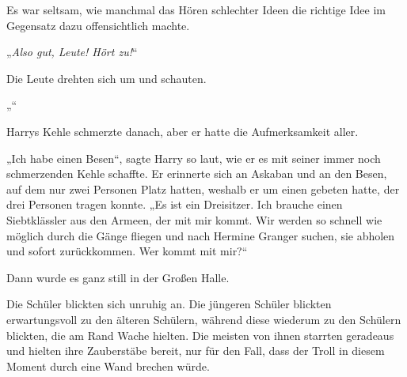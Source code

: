 Es war seltsam, wie manchmal das Hören schlechter Ideen die richtige Idee im Gegensatz dazu offensichtlich machte.

„\emph{Also gut, Leute! Hört zu!}“

Die Leute drehten sich um und schauten.

„“

Harrys Kehle schmerzte danach, aber er hatte die Aufmerksamkeit aller.

„Ich habe einen Besen“, sagte Harry so laut, wie er es mit seiner immer noch schmerzenden Kehle schaffte. Er erinnerte sich an Askaban und an den Besen, auf dem nur zwei Personen Platz hatten, weshalb er um einen gebeten hatte, der drei Personen tragen konnte.
„Es ist ein Dreisitzer. Ich brauche einen Siebtklässler aus den Armeen, der mit mir kommt. Wir werden so schnell wie möglich durch die Gänge fliegen und nach Hermine Granger suchen, sie abholen und sofort zurückkommen. Wer kommt mit mir?“

Dann wurde es ganz still in der Großen Halle.

\later

Die Schüler blickten sich unruhig an. Die jüngeren Schüler blickten erwartungsvoll zu den älteren Schülern, während diese wiederum zu den Schülern blickten, die am Rand Wache hielten. Die meisten von ihnen starrten geradeaus und hielten ihre Zauberstäbe bereit, nur für den Fall, dass der Troll in diesem Moment durch eine Wand brechen würde.

